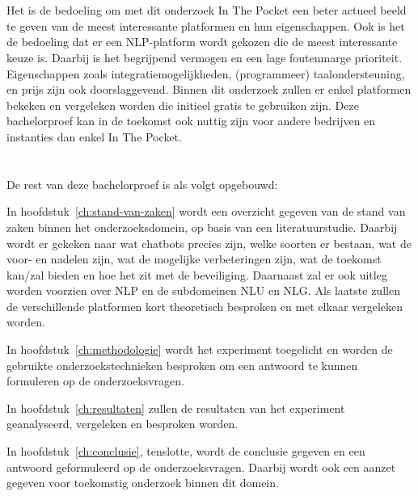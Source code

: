 \section{}
\label{sec:onderzoeksdoelstelling}

Het is de bedoeling om met dit onderzoek In The Pocket een beter actueel beeld te geven van de meest interessante platformen en hun eigenschappen. Ook is het de bedoeling dat er een NLP-platform wordt gekozen die de meest interessante keuze is. Daarbij is het begrijpend vermogen en een lage foutenmarge prioriteit. Eigenschappen zoals integratiemogelijkheden, (programmeer) taalondersteuning, en prijs zijn ook doorslaggevend. Binnen dit onderzoek zullen er enkel platformen bekeken en vergeleken worden die initieel gratis te gebruiken zijn. Deze bachelorproef kan in de toekomst ook nuttig zijn voor andere bedrijven en instanties dan enkel In The Pocket.

\newpage
\section{}
\label{sec:opzet-bachelorproef}


De rest van deze bachelorproef is als volgt opgebouwd:

In hoofdstuk~\ref{ch:stand-van-zaken} wordt een overzicht gegeven van de stand van zaken binnen het onderzoeksdomein, op basis van een literatuurstudie.  Daarbij wordt er gekeken naar wat chatbots precies zijn, welke soorten er bestaan, wat de voor- en nadelen zijn, wat de mogelijke verbeteringen zijn, wat de toekomst kan/zal bieden en hoe het zit met de beveiliging. Daarnaast zal er ook uitleg worden voorzien over NLP en de subdomeinen NLU en NLG. Als laatste zullen de verschillende platformen kort theoretisch besproken en met elkaar vergeleken worden.

In hoofdstuk~\ref{ch:methodologie} wordt het experiment toegelicht en worden de gebruikte onderzoekstechnieken besproken om een antwoord te kunnen formuleren op de onderzoeksvragen.

In hoofdstuk~\ref{ch:resultaten}  zullen de resultaten van het experiment geanalyseerd, vergeleken en besproken worden.

In hoofdstuk~\ref{ch:conclusie}, tenslotte, wordt de conclusie gegeven en een antwoord geformuleerd op de onderzoeksvragen. Daarbij wordt ook een aanzet gegeven voor toekomstig onderzoek binnen dit domein.









